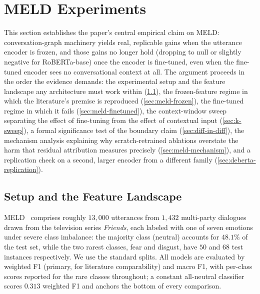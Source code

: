 \section{MELD Experiments}
\label{sec:meld}

This section establishes the paper's central empirical claim on MELD: conversation-graph machinery yields real, replicable gains when the utterance encoder is frozen, and those gains no longer hold (dropping to null or slightly negative for RoBERTa-base) once the encoder is fine-tuned, even when the fine-tuned encoder sees no conversational context at all. The argument proceeds in the order the evidence demands: the experimental setup and the feature landscape any architecture must work within (\ref{sec:meld-setup}), the frozen-feature regime in which the literature's premise is reproduced (\ref{sec:meld-frozen}), the fine-tuned regime in which it fails (\ref{sec:meld-finetuned}), the context-window sweep separating the effect of fine-tuning from the effect of contextual input (\ref{sec:k-sweep}), a formal significance test of the boundary claim (\ref{sec:diff-in-diff}), the mechanism analysis explaining why scratch-retrained ablations overstate the harm that residual attribution measures precisely (\ref{sec:meld-mechanism}), and a replication check on a second, larger encoder from a different family (\ref{sec:deberta-replication}).

\subsection{Setup and the Feature Landscape}
\label{sec:meld-setup}

MELD~\cite{poria2019meld} comprises roughly $13{,}000$ utterances from $1{,}432$ multi-party dialogues drawn from the television series \textit{Friends}, each labeled with one of seven emotions under severe class imbalance: the majority class (neutral) accounts for $48.1\%$ of the test set, while the two rarest classes, fear and disgust, have $50$ and $68$ test instances respectively. We use the standard splits. All models are evaluated by weighted F1 (primary, for literature comparability) and macro F1, with per-class scores reported for the rare classes throughout; a constant all-neutral classifier scores $0.313$ weighted F1 and anchors the bottom of every comparison.

